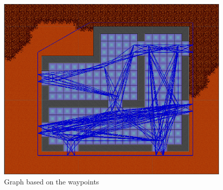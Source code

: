 \begin{figure}
	\includegraphics[width=\textwidth]{figures/astar/waypointsGraph}
	\caption{Graph based on the waypoints}
	\label{waypointgraph}
\end{figure}
